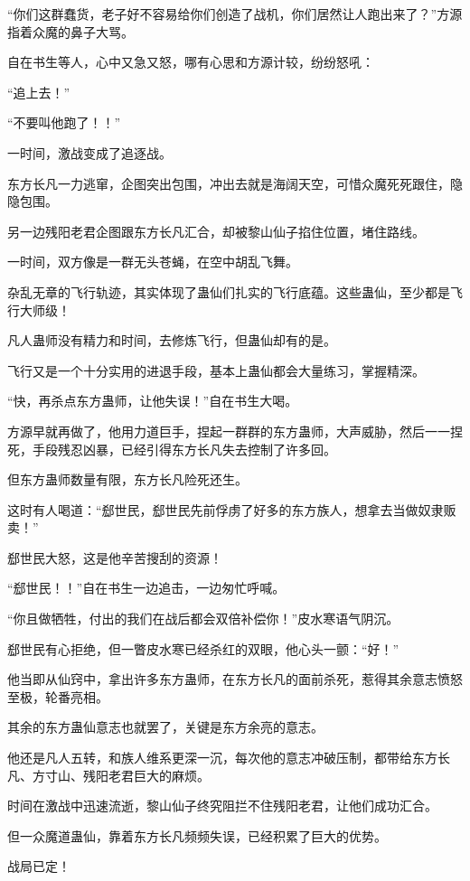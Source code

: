 \begin{this_body}
“你们这群蠢货，老子好不容易给你们创造了战机，你们居然让人跑出来了？”方源指着众魔的鼻子大骂。

自在书生等人，心中又急又怒，哪有心思和方源计较，纷纷怒吼：

“追上去！”

“不要叫他跑了！！”

一时间，激战变成了追逐战。

东方长凡一力逃窜，企图突出包围，冲出去就是海阔天空，可惜众魔死死跟住，隐隐包围。

另一边残阳老君企图跟东方长凡汇合，却被黎山仙子掐住位置，堵住路线。

一时间，双方像是一群无头苍蝇，在空中胡乱飞舞。

杂乱无章的飞行轨迹，其实体现了蛊仙们扎实的飞行底蕴。这些蛊仙，至少都是飞行大师级！

凡人蛊师没有精力和时间，去修炼飞行，但蛊仙却有的是。

飞行又是一个十分实用的进退手段，基本上蛊仙都会大量练习，掌握精深。

“快，再杀点东方蛊师，让他失误！”自在书生大喝。

方源早就再做了，他用力道巨手，捏起一群群的东方蛊师，大声威胁，然后一一捏死，手段残忍凶暴，已经引得东方长凡失去控制了许多回。

但东方蛊师数量有限，东方长凡险死还生。

这时有人喝道：“郄世民，郄世民先前俘虏了好多的东方族人，想拿去当做奴隶贩卖！”

郄世民大怒，这是他辛苦搜刮的资源！

“郄世民！！”自在书生一边追击，一边匆忙呼喊。

“你且做牺牲，付出的我们在战后都会双倍补偿你！”皮水寒语气阴沉。

郄世民有心拒绝，但一瞥皮水寒已经杀红的双眼，他心头一颤：“好！”

他当即从仙窍中，拿出许多东方蛊师，在东方长凡的面前杀死，惹得其余意志愤怒至极，轮番亮相。

其余的东方蛊仙意志也就罢了，关键是东方余亮的意志。

他还是凡人五转，和族人维系更深一沉，每次他的意志冲破压制，都带给东方长凡、方寸山、残阳老君巨大的麻烦。

时间在激战中迅速流逝，黎山仙子终究阻拦不住残阳老君，让他们成功汇合。

但一众魔道蛊仙，靠着东方长凡频频失误，已经积累了巨大的优势。

战局已定！


\end{this_body}
